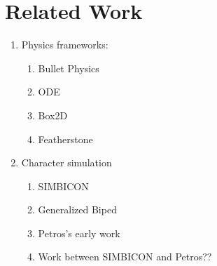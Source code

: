 
\section{Related Work}

\begin{enumerate}
	\item{Physics frameworks:}
	\begin{enumerate}
		\item Bullet Physics
		\item ODE
		\item Box2D
		\item Featherstone
	\end{enumerate}
	\item {Character simulation}
	\begin{enumerate}
		\item {SIMBICON~\cite{Yin07}}
		\item {Generalized Biped}
		\item {Petros's early work}
		\item {Work between SIMBICON and Petros??}
	\end{enumerate}
\end{enumerate}
